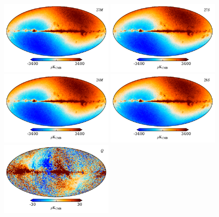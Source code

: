 \documentclass{aa}
\begin{document}
\begin{figure}[p]
  \centering
  \includegraphics[width=0.48\textwidth]{figs/map_T_27M.pdf}
  \includegraphics[width=0.48\textwidth]{figs/map_T_27S.pdf}\\
  \includegraphics[width=0.48\textwidth]{figs/map_T_28M.pdf}
  \includegraphics[width=0.48\textwidth]{figs/map_T_28S.pdf}\\
  \includegraphics[width=0.48\textwidth]{figs/map_Q_badpol.pdf}

\end{figure}
\end{document}
